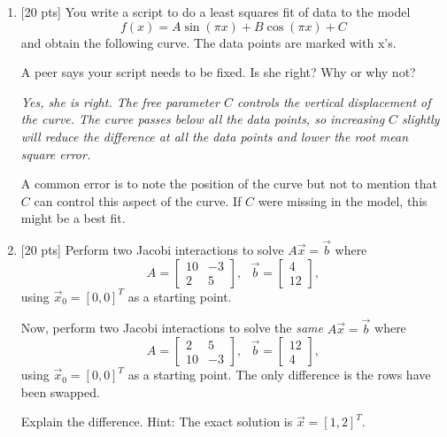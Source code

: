 \documentclass[12pt]{article}
\begin{document}
\begin{enumerate}

\item{[20 pts]} You write a script to do a least squares fit of data
to the model
\[
f(x) = A \sin(\pi x) + B \cos(\pi x) + C
\]
and obtain the following curve.  The data points are marked with x's.
\begin{center}
\end{center}
A peer says your script needs to be fixed.  Is she right?  Why or why not?

\bigskip

{\em 
Yes, she is right.  The free parameter $C$ controls the vertical
displacement of the curve.  The curve passes below all the data
points, so increasing $C$ slightly will reduce the difference at all the
data points and lower the root mean square error.

A common error is to note the position of the curve but not to mention
that $C$ can control this aspect of the curve.  If $C$ were missing in
the model, this might be a best fit.
}

\newpage

\item{[20 pts]} Perform two Jacobi interactions to solve $A \vec{x} =
  \vec{b}$ where
\[
A = \left[\begin{array}{rr}
10 & -3 \\ 2 & 5
\end{array}\right], \ \ \ \vec{b} = \left[\begin{array}{r}
4 \\ 12
\end{array}\right],
\]
using $\vec{x}_0 = [0,  0]^T$ as a starting point.


Now, perform two Jacobi interactions to solve the {\em same} $A \vec{x} =
  \vec{b}$ where
\[
A = \left[\begin{array}{rr}
2 & 5 \\ 10 & -3 
\end{array}\right], \ \ \ \vec{b} = \left[\begin{array}{r}
12 \\ 4
\end{array}\right],
\]
using $\vec{x}_0 = [0,  0]^T$ as a starting point.  The only
difference is the rows have been swapped.

Explain the difference.  Hint: The exact solution is $\vec{x} = [1,
  2]^T$.

\bigskip

{\em

}
\end{enumerate}
\end{document}
